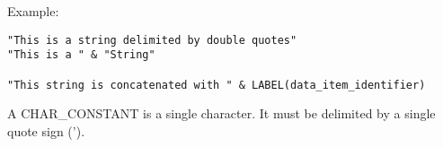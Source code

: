 Example:


\begin{boxedminipage}[t]{\linewidth}
\begin{verbatim}
"This is a string delimited by double quotes"
"This is a " & "String"

"This string is concatenated with " & LABEL(data_item_identifier)
\end{verbatim}
\end{boxedminipage}
\vspace{1cm}


\begin{multicols}{2}






\end{multicols}



A CHAR\_CONSTANT is a single character.
It must be delimited by a single quote sign (').
